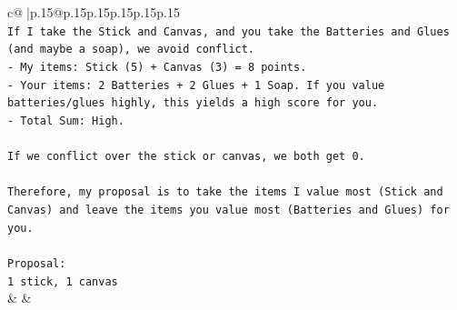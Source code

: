 \documentclass{article}
\begin{document}
{\begin{supertabular}{c@{$\;$}|p{.15\linewidth}@{}p{.15\linewidth}p{.15\linewidth}p{.15\linewidth}p{.15\linewidth}p{.15\linewidth}}
{{{\\ 
\texttt{If I take the Stick and Canvas, and you take the Batteries and Glues (and maybe a soap), we avoid conflict.} \\
\texttt{{-} My items: Stick (5) + Canvas (3) = 8 points.} \\
\texttt{{-} Your items: 2 Batteries + 2 Glues + 1 Soap. If you value batteries/glues highly, this yields a high score for you.} \\
\texttt{{-} Total Sum: High.} \\
\\ 
\texttt{If we conflict over the stick or canvas, we both get 0.} \\
\\ 
\texttt{Therefore, my proposal is to take the items I value most (Stick and Canvas) and leave the items you value most (Batteries and Glues) for you.} \\
\\ 
\texttt{Proposal:} \\
\texttt{1 stick, 1 canvas} \\
            }
        }
    }
    & & \\ \\


\end{supertabular}}
\end{document}
